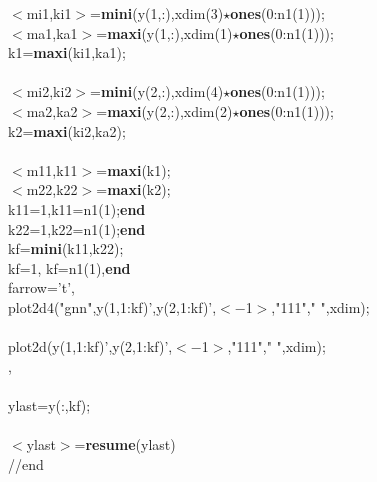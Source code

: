 {\begin{flushleft}
{\cmarg \hspace{1.0cm}$<$mi1,ki1$>$={\bf mini}(y(1,:),xdim(3)$\star${\bf ones}(0:n1(1)));\\ 
\cmarg \hspace{1.0cm}$<$ma1,ka1$>$={\bf maxi}(y(1,:),xdim(1)$\star${\bf ones}(0:n1(1)));\\ 
\cmarg \hspace{1.0cm}k1={\bf maxi}(ki1,ka1);\\ 
\cmarg \\ 
\cmarg \hspace{1.0cm}$<$mi2,ki2$>$={\bf mini}(y(2,:),xdim(4)$\star${\bf ones}(0:n1(1)));\\ 
\cmarg \hspace{1.0cm}$<$ma2,ka2$>$={\bf maxi}(y(2,:),xdim(2)$\star${\bf ones}(0:n1(1)));\\ 
\cmarg \hspace{1.0cm}k2={\bf maxi}(ki2,ka2);\\ 
\cmarg \\ 
\cmarg \hspace{1.0cm}$<$m11,k11$>$={\bf maxi}(k1);\\ 
\cmarg \hspace{1.0cm}$<$m22,k22$>$={\bf maxi}(k2);\\ 
\cmarg \hspace{1.0cm}{\bf if} k11=1,k11=n1(1);{\bf end}\\ 
\cmarg \hspace{1.0cm}{\bf if} k22=1,k22=n1(1);{\bf end}\\ 
\cmarg \hspace{1.0cm}kf={\bf mini}(k11,k22);\\ 
\cmarg \hspace{1.0cm}{\bf if} kf=1, kf=n1(1),{\bf end}\\ 
\cmarg \hspace{1.2cm}{\bf if} farrow='t',\\ 
\cmarg \hspace{1.8cm}plot2d4("gnn",y(1,1:kf)',y(2,1:kf)',$<$$-$1$>$,"111"," ",xdim);\\ 
\cmarg \hspace{1.2cm}{\bf else} \\ 
\cmarg \hspace{1.8cm}plot2d(y(1,1:kf)',y(2,1:kf)',$<$$-$1$>$,"111"," ",xdim);\\ 
\cmarg \hspace{1.2cm}{\bf end},\\ 
\cmarg \hspace{1.0cm}{\bf end} \\ 
\cmarg \hspace{1.0cm}ylast=y(:,kf);\\ 
 \\ 
\cmarg $<$ylast$>$={\bf resume}(ylast)\\ 
\cmarg //end }
\end{flushleft}}

